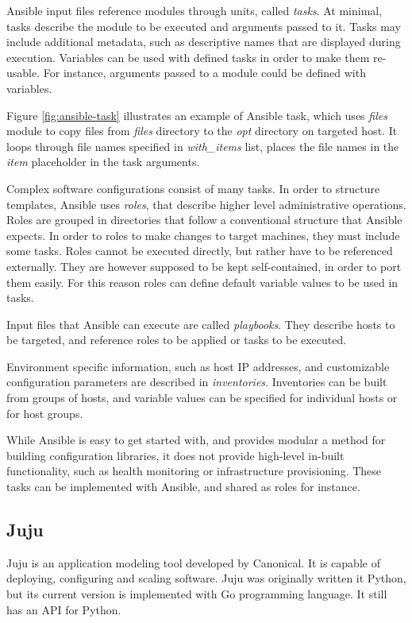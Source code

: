 \documentclass[officiallayout]{tktla}
\begin{document}
Ansible input files reference modules through units, called \textit{tasks}.
At minimal, tasks describe the module to be executed and arguments passed to
it. Tasks may include additional metadata, such as descriptive names that are
displayed during execution. Variables can be used with defined tasks in order
to make them re-usable. For instance, arguments passed to a module could be
defined with variables.

Figure \ref{fig:ansible-task} illustrates an example of Ansible task, which
uses \textit{files} module to copy files from \textit{files} directory to the
\textit{opt} directory on targeted host. It loops through file names specified
in \textit{with\_items} list, places the file names in the \textit{item}
placeholder in the task arguments.

Complex software configurations consist of many tasks. In order to structure
templates, Ansible uses \textit{roles}, that describe higher level
administrative operations. Roles are grouped in directories that follow a
conventional structure that Ansible expects. In order to roles to make changes
to target machines, they must include some tasks. Roles cannot be executed
directly, but rather have to be referenced externally. They are however
supposed to be kept self-contained, in order to port them easily. For this
reason roles can define default variable values to be used in tasks.

Input files that Ansible can execute are called \textit{playbooks}. They
describe hosts to be targeted, and reference roles to be applied or tasks to be
executed.

Environment specific information, such as host IP addresses, and customizable
configuration parameters are described in \textit{inventories}. Inventories can
be built from groups of hosts, and variable values can be specified for
individual hosts or for host groups.

While Ansible is easy to get started with, and provides modular a method for
building configuration libraries, it does not provide high-level in-built
functionality, such as health monitoring or infrastructure provisioning. These
tasks can be implemented with Ansible, and shared as roles for instance.

\subsection{Juju}

Juju \cite{juju} is an application modeling tool developed by Canonical. It is
capable of deploying, configuring and scaling software. Juju was originally
written it Python, but its current version is implemented with Go programming
language. It still has an API for Python.
\end{document}
